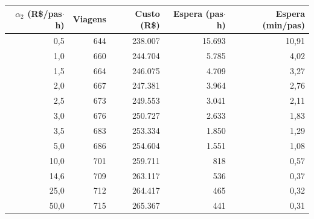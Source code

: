 \begin{tabular}{rrrrr}
\toprule
$\alpha_2$ (R\$/pas$\cdot$h) & Viagens & Custo (R\$) & Espera (pas$\cdot$h) & Espera (min/pas) \\
\midrule
0{,}5 & 644 & 238.007 & 15.693 & 10{,}91 \\
1{,}0 & 660 & 244.704 & 5.785 & 4{,}02 \\
1{,}5 & 664 & 246.075 & 4.709 & 3{,}27 \\
2{,}0 & 667 & 247.381 & 3.964 & 2{,}76 \\
2{,}5 & 673 & 249.553 & 3.041 & 2{,}11 \\
3{,}0 & 676 & 250.727 & 2.633 & 1{,}83 \\
3{,}5 & 683 & 253.334 & 1.850 & 1{,}29 \\
5{,}0 & 686 & 254.604 & 1.551 & 1{,}08 \\
10{,}0 & 701 & 259.711 & 818 & 0{,}57 \\
14{,}6 & 709 & 263.117 & 536 & 0{,}37 \\
25{,}0 & 712 & 264.417 & 465 & 0{,}32 \\
50{,}0 & 715 & 265.367 & 441 & 0{,}31 \\
\bottomrule
\end{tabular}
